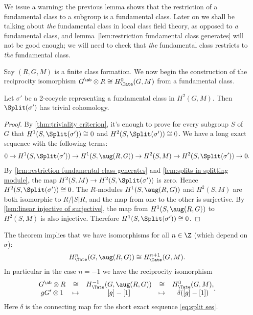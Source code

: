 We issue a warning: the previous lemma shows that the restriction of a fundamental class to
a subgroup is a fundamental class. Later on we shall be talking about \emph{the} fundamental class
in local class field theory, as opposed to \emph{a} fundamental class, and
lemma~\ref{lem:restriction fundamental class generates} will not be good enough; we will
need to check that \emph{the} fundamental class restricts to \emph{the} fundamental class.

Say $(R,G,M)$ is a finite class formation. We now begin the construction of the reciprocity
isomorphism $G^{\ab}\otimes R\cong H^0_{\Tate}(G,M)$ from a fundamental class.

\begin{theorem} \label{thm:splitting module trivial}
	Let $\sigma'$ be a 2-cocycle representing a fundamental class in $H^2(G,M)$.
	Then $\Split(\sigma')$ has trivial cohomology.
\end{theorem}

\begin{proof}
	By \ref{thm:triviality criterion}, it's enough to prove for every subgroup $S$ of $G$ that
	$H^1(S,\Split(\sigma')) \cong 0$ and $H^2(S,\Split(\sigma')) \cong 0$.
	We have a long exact sequence with the following terms:
	\[
		0 \to H^1(S,\Split(\sigma')) \to H^1(S,\aug(R,G)) \to H^2(S,M) \to H^2(S,\Split(\sigma'))
		\to 0.
	\]
	By \ref{lem:restriction fundamental class generates} and \ref{lem:splits in splitting module},
	the map $H^2(S,M) \to H^2(S,\Split(\sigma'))$ is zero.
	Hence $H^2(S,\Split(\sigma')) \cong 0$.
	The $R$-modules $H^1(S,\aug(R,G))$ and $H^2(S,M)$ are both isomorphic to $R / |S|R$,
	and the map from one to the other is surjective.
	By \ref{lem:linear injective of surjective}, the map
	from $H^1(S,\aug(R,G))$ to $H^2(S,M)$ is also injective.
	Therefore $H^1(S,\Split(\sigma')) \cong 0$.
\end{proof}

\begin{definition}
  \label{def:reciprocity iso}
  The theorem implies that we have isomorphisms for all $n\in \Z$ (which depend on $\sigma$):
	\[
		H^{n}_{\Tate}(G,\aug(R,G)) \cong H^{n+1}_{\Tate}(G,M) .
	\]
	In particular in the case $n = -1$ we have the reciprocity isomorphism
	\[
		\begin{matrix}
			G^{\ab} \otimes R & \cong & H^{-1}_{\Tate}(G,\aug(R,G)) &\cong&  H^0_{\Tate}(G,M), \\
			gG' \otimes 1 & \mapsto & [g] - [1] & \mapsto & \delta ([g] - [1])
		\end{matrix}.
	\]
	Here $\delta$ is the connecting map for the short exact sequence \ref{eq:split ses}.
\end{definition}

